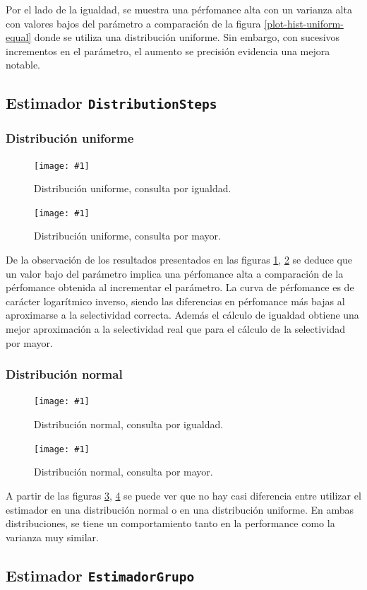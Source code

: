 \documentclass[a4paper, 10pt, twoside]{article}
\newcommand{\grafico}[3]{
  \begin{figure}[H]
    \texttt{[image: \#1]}
    \caption{#2}
    \label{#3}
  \end{figure}
}
\begin{document}
Por el lado de la igualdad, se muestra una pérfomance alta con un varianza alta con valores bajos del parámetro a comparación de la figura \ref{plot-hist-uniform-equal} 
donde se utiliza una distribución uniforme. Sin embargo, con sucesivos incrementos en el parámetro, el aumento se precisión evidencia una mejora notable.   

\subsection{Estimador \texttt{DistributionSteps}}


\subsubsection{Distribución uniforme}
\grafico{plot-diststep-uniform-equal}
        {Distribución uniforme, consulta por igualdad.}
        {plot-diststep-uniform-equal}
\grafico{plot-diststep-uniform-greater}
        {Distribución uniforme, consulta por mayor.}
        {plot-diststep-uniform-greater}
De la observación de los resultados presentados en las figuras \ref{plot-diststep-uniform-equal}, \ref{plot-diststep-uniform-greater} se deduce que un valor bajo del parámetro implica una pérfomance alta a comparación de la pérfomance obtenida al 
incrementar el parámetro. La curva de pérfomance es de carácter logarítmico inverso, siendo las diferencias en pérfomance más bajas
al aproximarse a la selectividad correcta.
Además el cálculo de igualdad obtiene una mejor aproximación a la selectividad real 
que para el cálculo de la selectividad por mayor.
\subsubsection{Distribución normal}    
\grafico{plot-diststep-normal-equal}
        {Distribución normal, consulta por igualdad.}
        {plot-diststep-normal-equal}
\grafico{plot-diststep-normal-greater}
        {Distribución normal, consulta por mayor.}
        {plot-diststep-normal-greater}

A partir de las figuras \ref{plot-diststep-normal-equal}, \ref{plot-diststep-normal-greater} se puede ver que no hay casi diferencia entre utilizar el estimador 
en una distribución normal o en una distribución uniforme. En ambas distribuciones, se tiene un comportamiento tanto en la performance como la varianza muy similar.

\subsection{Estimador \texttt{EstimadorGrupo}}
\end{document}
